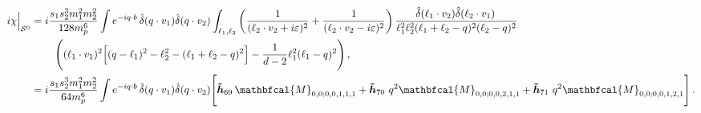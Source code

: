 \begin{align}
    \begin{split}
i\chi\Big|_{\mathcal{S}^{0}}&=i\frac{s_1 s_2^3m_1^2 m_2^2}{128 m_p^6}\int e^{-iq\cdot b} \,\hat\delta(q\cdot v_1)\hat\delta(q\cdot v_2)\int_{\ell_{1},\ell_{2}}\left(\frac{1}{(\ell_2\cdot v_2+i\varepsilon)^2}+\frac{1}{(\ell_2\cdot v_2-i\varepsilon)^2}\right)\frac{\hat\delta(\ell_{1}\cdot v_2)\hat\delta(\ell_{2}\cdot v_1)\,}{\ell_{1}^2 \ell_{2}^2 (\ell_{1}+\ell_{2}-q)^2(\ell_{2}-q)^2}\\ &
         \hspace{0.8cm}\Bigg((\ell_{1}\cdot v_1)^2\Big[(q-\ell_{1})^2-\ell_2^2-(\ell_1+\ell_2-q)^2\Big]-\frac{1}{d-2}\ell_1^2(\ell_1-q)^2\Bigg)\,,\\ &
        =i\frac{s_1 s_2^3m_1^2 m_2^2}{64 m_p^6}\int e^{-iq\cdot b} \,\hat\delta(q\cdot v_1)\hat\delta(q\cdot v_2)\Bigg[\boldsymbol{\tilde h}_{69}\,\mathbfcal{M}_{0,0;0,0,1,1,1}+\boldsymbol{\tilde h}_{70}\,\,q^2
      \mathbfcal{M}_{0,0;0,0,2,1,1} +\boldsymbol{\tilde h}_{71}\,\,q^2\mathbfcal{M}_{0,0;0,0,1,2,1}\Bigg]\,.
         \end{split}
\end{align}
